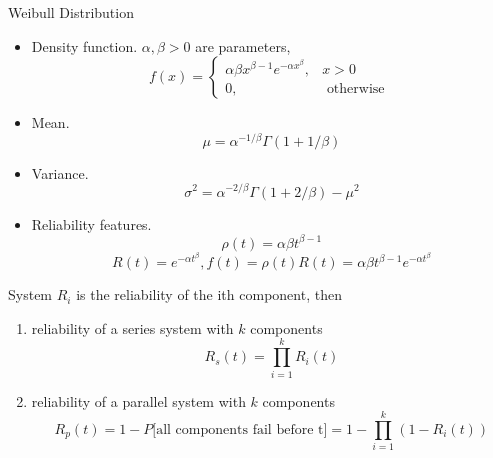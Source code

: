 \documentclass{beamer}
\begin{document}
\begin{frame}{Weibull Distribution}
\begin{itemize}
\item Density function. $\alpha, \beta>0$ are parameters,
$$
f(x)= \begin{cases}\alpha \beta x^{\beta-1} e^{-\alpha x^{\beta}}, & x>0 \\ 0, & \text { otherwise }\end{cases}
$$
\item Mean.
$$
\mu=\alpha^{-1 / \beta} \Gamma(1+1 / \beta)
$$
\item Variance.
$$
\sigma^{2}=\alpha^{-2 / \beta} \Gamma(1+2 / \beta)-\mu^{2}
$$
\item Reliability features.
$$
\rho(t)=\alpha \beta t^{\beta-1}$$$$ R(t)=e^{-\alpha t^{\beta}}, f(t)=\rho(t) R(t)=\alpha \beta t^{\beta-1} e^{-\alpha t^{\beta}}
$$
\end{itemize}
\end{frame}

\begin{frame}{System}
$R_{i}$ is the reliability of the ith component, then
\begin{enumerate}
\item reliability of a series system with $k$ components
$$
R_{s}(t)=\prod_{i=1}^{k} R_{i}(t)
$$
\item reliability of a parallel system with $k$ components
$$R_{p}(t)=1-P\text{[all components fail before t]}=1-\prod_{i=1}^{k}\left(1-R_{i}(t)\right)$$
\end{enumerate}
\end{frame}
\end{document}
